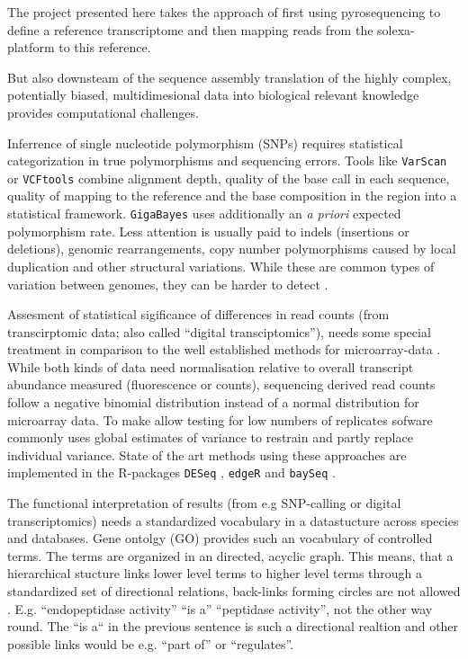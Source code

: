 The project presented here takes the approach of first using
pyrosequencing to define a reference transcriptome and then mapping
reads from the solexa-platform to this reference.

But also downsteam of the sequence assembly translation of the highly
complex, potentially biased, multidimesional data into biological
relevant knowledge provides computational challenges.

Inferrence of single nucleotide polymorphism (SNPs) requires
statistical categorization in true polymorphisms and sequencing
errors. Tools like \texttt{VarScan} \cite{pmid19542151} or
\texttt{VCFtools} \cite{pmid21653522} combine alignment depth, quality
of the base call in each sequence, quality of mapping to the reference
and the base composition in the region into a statistical
framework. \texttt{GigaBayes} \cite{pmid18204455} uses additionally an
\textit{a priori} expected polymorphism rate. Less attention is
usually paid to indels (insertions or deletions), genomic
rearrangements, copy number polymorphisms caused by local duplication
and other structural variations. While these are common types of
variation between genomes, they can be harder to detect
\cite{pmid22084086}.

Assesment of statistical sigificance of differences in read counts
(from transcirptomic data; also called ``digital transciptomics''),
needs some special treatment in comparison to the well established
methods for microarray-data \cite{smyth2005limma}. While both kinds of
data need normalisation relative to overall transcript abundance
measured (fluorescence or counts), sequencing derived read counts
follow a negative binomial distribution \cite{pmid17728317} instead of
a normal distribution for microarray data. To make allow testing for
low numbers of replicates sofware commonly uses global estimates of
variance to restrain and partly replace individual variance. State of
the art methods using these approaches are implemented in the
R-packages \texttt{DESeq} \cite{pmid20979621}, \texttt{edgeR}
\cite{pmid19910308} and \texttt{baySeq} \cite{pmid20698981}.

The functional interpretation of results (from e.g SNP-calling or
digital transcriptomics) needs a standardized vocabulary in a
datastucture across species and databases. Gene ontolgy (GO) provides
such an vocabulary of controlled terms.  The terms are organized in an
directed, acyclic graph. This means, that a hierarchical stucture
links lower level terms to higher level terms through a standardized
set of directional relations, back-links forming circles are not
allowed \cite{pmid10802651,pmid22123736}. E.g. ``endopeptidase
activity'' ``is a'' ``peptidase activity'', not the other way
round. The ``is a`` in the previous sentence is such a directional
realtion and other possible links would be e.g. ``part of'' or
``regulates''.


